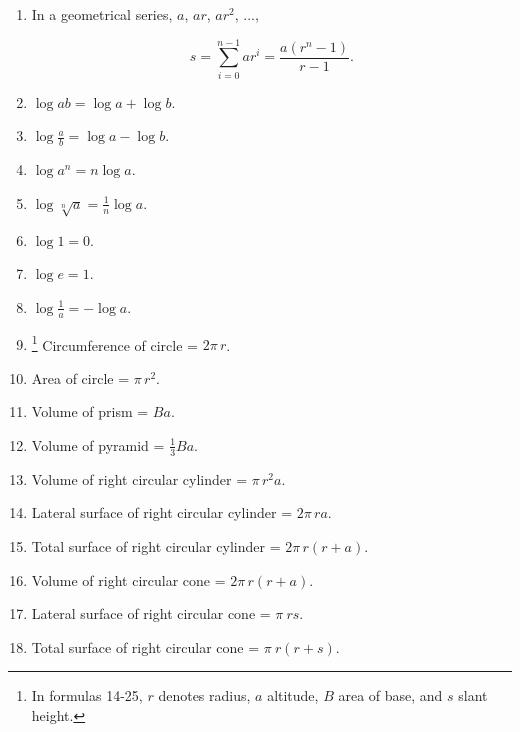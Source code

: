 \begin{enumerate}
\item
In a geometrical series, $a$, $ar$, $ar^2$, ...,
 
\[
s = \sum_{i=0}^{n-1} ar^{i} = \frac{a(r^n - 1)}{r - 1}.
\]

\item
$\log ab = \log a + \log b$.

 \item
$\log \frac{a}{b} = \log a - \log b$.

\item
$\log a^n = n\log a$.

\item
$\log \sqrt[n]{a} = \frac{1}{n} \log a$.

\item
$\log 1 = 0$.

\item
$\log e = 1$.

\item
$\log \frac{1}{a} = -\log a$.

\item \footnote{In formulas 14-25, $r$ denotes radius, 
$a$ altitude, $B$ area of base, and $s$ slant height.}
Circumference of circle = $2 \pi\, r$. 

\item
Area of circle = $\pi\, r^2$.

\item
Volume of prism = $Ba$.
 
\item
Volume of pyramid = $\frac{1}{3} Ba$.

\item
Volume of right circular cylinder = $\pi\, r^2a$.
 
\item
Lateral surface of right circular cylinder = $2 \pi\, ra$.

\item
Total surface of right circular cylinder = $2 \pi\, r(r + a)$.

\item
Volume of right circular cone = $2 \pi\, r(r + a)$.

\item
Lateral surface of right circular cone = $\pi\ rs$.

\item
Total surface of right circular cone = $\pi\ r(r + s)$.


\end{enumerate}
